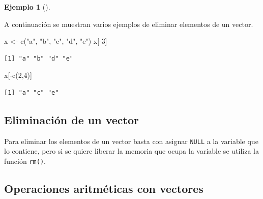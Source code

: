 \documentclass[
  a4paper,
]{scrreport}
\newenvironment{Shaded}{\begin{snugshade}}{\end{snugshade}}
\newcommand{\DecValTok}[1]{\textcolor[rgb]{0.68,0.00,0.00}{#1}}
\newcommand{\FunctionTok}[1]{\textcolor[rgb]{0.28,0.35,0.67}{#1}}
\newcommand{\NormalTok}[1]{\textcolor[rgb]{0.00,0.23,0.31}{#1}}
\newcommand{\OtherTok}[1]{\textcolor[rgb]{0.00,0.23,0.31}{#1}}
\newcommand{\SpecialCharTok}[1]{\textcolor[rgb]{0.37,0.37,0.37}{#1}}
\newcommand{\StringTok}[1]{\textcolor[rgb]{0.13,0.47,0.30}{#1}}
\theoremstyle{definition}
\theoremstyle{definition}
\newtheorem{example}{Ejemplo}[chapter]
\theoremstyle{remark}
\begin{document}
\leavevmode{}%
\begin{example}[]\label{exm-eliminar-elementos-vector}

A continuación se muestran varios ejemplos de eliminar elementos de un
vector.

\begin{Shaded}
\begin{Highlighting}[]
\NormalTok{x }\OtherTok{\textless{}{-}} \FunctionTok{c}\NormalTok{(}\StringTok{"a"}\NormalTok{, }\StringTok{"b"}\NormalTok{, }\StringTok{"c"}\NormalTok{, }\StringTok{"d"}\NormalTok{, }\StringTok{"e"}\NormalTok{)}
\NormalTok{x[}\SpecialCharTok{{-}}\DecValTok{3}\NormalTok{]}
\end{Highlighting}
\end{Shaded}

\begin{verbatim}
[1] "a" "b" "d" "e"
\end{verbatim}

\begin{Shaded}
\begin{Highlighting}[]
\NormalTok{x[}\SpecialCharTok{{-}}\FunctionTok{c}\NormalTok{(}\DecValTok{2}\NormalTok{,}\DecValTok{4}\NormalTok{)]}
\end{Highlighting}
\end{Shaded}

\begin{verbatim}
[1] "a" "c" "e"
\end{verbatim}

\end{example}

\hypertarget{eliminaciuxf3n-de-un-vector}{%
\subsection{Eliminación de un
vector}\label{eliminaciuxf3n-de-un-vector}}

Para eliminar los elementos de un vector basta con asignar \texttt{NULL}
a la variable que lo contiene, pero si se quiere liberar la memoria que
ocupa la variable se utiliza la función \texttt{rm()}.

\hypertarget{operaciones-aritmuxe9ticas-con-vectores}{%
\subsection{Operaciones aritméticas con
vectores}\label{operaciones-aritmuxe9ticas-con-vectores}}
\end{document}
